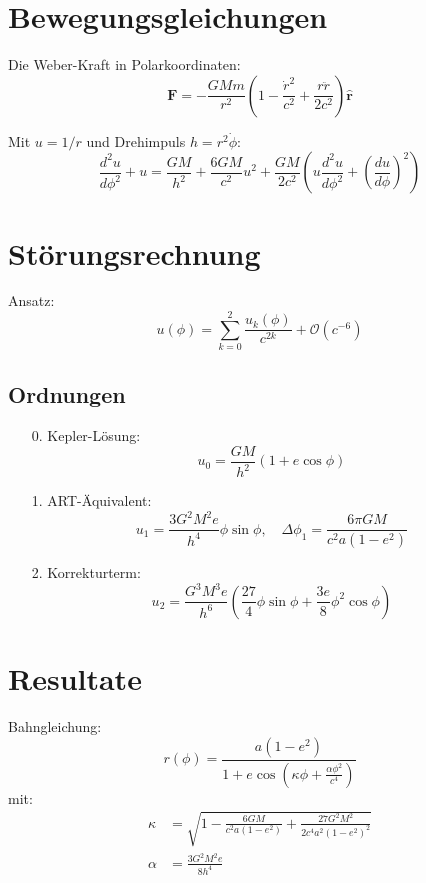 \section{Bewegungsgleichungen}
Die Weber-Kraft in Polarkoordinaten:
\begin{equation}
\mathbf{F} = -\frac{GMm}{r^2}\left(1 - \frac{\dot{r}^2}{c^2} + \frac{r\ddot{r}}{2c^2}\right)\mathbf{\hat{r}}
\end{equation}

Mit $u=1/r$ und Drehimpuls $h=r^2\dot{\phi}$:
\begin{equation}
\frac{d^2u}{d\phi^2} + u = \frac{GM}{h^2} + \frac{6GM}{c^2}u^2 + \frac{GM}{2c^2}\left(u\frac{d^2u}{d\phi^2} + \left(\frac{du}{d\phi}\right)^2\right)
\end{equation}

\section{Störungsrechnung}
Ansatz:
\begin{equation}
u(\phi) = \sum_{k=0}^2 \frac{u_k(\phi)}{c^{2k}} + \mathcal{O}(c^{-6})
\end{equation}

\subsection{Ordnungen}
\begin{itemize}
\item[0.] Kepler-Lösung:
\begin{equation}
u_0 = \frac{GM}{h^2}(1 + e\cos\phi)
\end{equation}

\item[1.] ART-Äquivalent:
\begin{equation}
u_1 = \frac{3G^2M^2e}{h^4}\phi\sin\phi,\quad \Delta\phi_1 = \frac{6\pi GM}{c^2a(1-e^2)}
\end{equation}

\item[2.] Korrekturterm:
\begin{equation}
u_2 = \frac{G^3M^3e}{h^6}\left(\frac{27}{4}\phi\sin\phi + \frac{3e}{8}\phi^2\cos\phi\right)
\end{equation}
\end{itemize}

\section{Resultate}
Bahngleichung:
\begin{equation}
\boxed
{
    r(\phi) = \frac{a(1-e^2)}{1 + e\cos\left(\kappa\phi + \frac{\alpha\phi^2}{c^4}\right)}
}
\end{equation}
mit:
\begin{align}
\kappa &= \sqrt{1 - \frac{6GM}{c^2a(1-e^2)} + \frac{27G^2M^2}{2c^4a^2(1-e^2)^2}}\\
\alpha &= \frac{3G^2M^2e}{8h^4}
\end{align}

